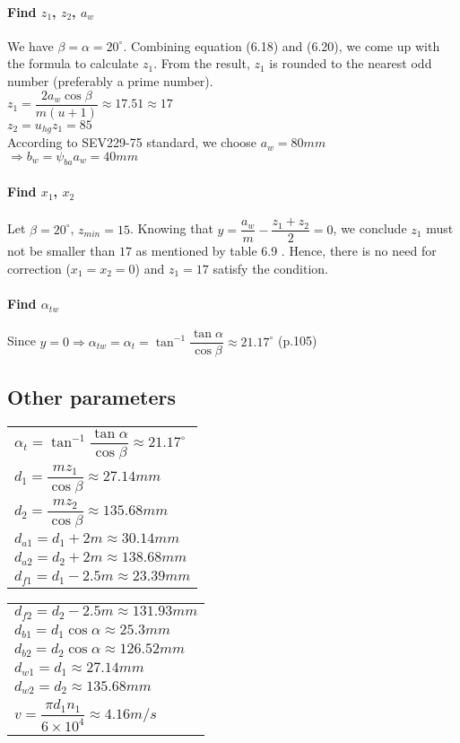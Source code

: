 \paragraph{Find $ z_1 $, $ z_2 $, $ a_w $} We have $ \beta = \alpha = 20^\circ $. Combining equation (6.18) and (6.20), we come up with the formula to calculate $ z_1 $. From the result, $ z_1 $ is rounded to the nearest odd number (preferably a prime number).\\
$ z_1 = \dfrac{2a_w\cos\beta}{m(u+1)} \approx 17.51 \approx 17$\\
$ z_2 = u_{hg}z_1 = 85 $\\
According to SEV229-75 standard, we choose $ a_w = 80\unit{mm}$\\
$ \Rightarrow b_w = \psi_{ba}a_w = 40\unit{mm}$ 
\paragraph{Find $ x_1 $, $ x_2 $} Let $ \beta = 20^\circ $, $ z_{min} = 15$. Knowing that $ y = \dfrac{a_w}{m} - \dfrac{z_1+z_2}{2} = 0$, we conclude $ z_1$ must not be smaller than $17$ as mentioned by table 6.9 . Hence, there is no need for correction ($ x_1=x_2=0 $) and $ z_1 = 17 $ satisfy the condition.
\paragraph{Find $ \alpha_{tw} $} Since $ y=0 \Rightarrow \alpha_{tw}=\alpha_t= \tan^{-1}\dfrac{\tan\alpha}{\cos\beta} \approx 21.17^\circ$ (p.105)
\subsection{Other parameters}
\begin{tabular}[t]{p{8cm}}
	$ \alpha_t = \tan^{-1}\dfrac{\tan\alpha}{\cos\beta} \approx 21.17^\circ $\\
	$ d_1 = \dfrac{mz_1}{\cos\beta} \approx 27.14\unit{mm} $\\
	$ d_2 = \dfrac{mz_2}{\cos\beta} \approx 135.68\unit{mm} $\\
	$ d_{a1} = d_1 + 2m \approx 30.14\unit{mm}$\\
	$ d_{a2} = d_2 + 2m \approx 138.68\unit{mm}$\\
	$ d_{f1} = d_1 - 2.5m \approx 23.39\unit{mm}$\\
\end{tabular}
\begin{tabular}[t]{p{8cm}}
	$ d_{f2} = d_2 - 2.5m \approx 131.93\unit{mm}$\\
	$ d_{b1} = d_1\cos\alpha \approx 25.3\unit{mm}$\\
	$ d_{b2} = d_2\cos\alpha \approx 126.52\unit{mm}$\\
	$ d_{w1} = d_1 \approx 27.14\unit{mm}$\\
	$ d_{w2} = d_2 \approx 135.68\unit{mm} $\\
	$ v = \dfrac{\pi d_1n_1}{6\times10^4} \approx 4.16\unit{m/s}$
\end{tabular}


